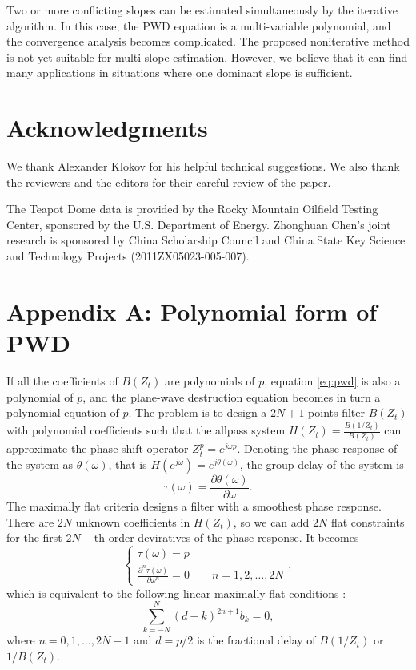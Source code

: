 Two or more conflicting slopes can be estimated simultaneously by the iterative algorithm.
In this case, the PWD equation is a multi-variable polynomial,
and the convergence analysis becomes complicated.
The proposed noniterative method is not yet suitable for multi-slope estimation.
However, we believe that it can find many applications in situations 
where one dominant slope is sufficient.


\section{Acknowledgments}

We thank Alexander Klokov for his helpful technical suggestions.
We also thank the reviewers and the editors for 
their careful review of the paper.

The Teapot Dome data is provided by the Rocky Mountain Oilfield Testing Center,
sponsored by the U.S. Department of Energy.
Zhonghuan Chen's joint research is sponsored by China Scholarship Council
and China State Key Science and Technology Projects (2011ZX05023-005-007).

\appendix
\section{Appendix A: Polynomial form of PWD}

If all the coefficients of $B(Z_t)$ are polynomials of $p$,
equation \ref{eq:pwd} is also a polynomial of $p$,
and the plane-wave destruction equation becomes 
in turn a polynomial equation of $p$.
The problem is to design a $2N+1$ points filter $B(Z_t)$ 
with polynomial coefficients
such that the allpass system $H(Z_t)=\frac{B(1/Z_t)}{B(Z_t)}$ can approximate 
the phase-shift operator $Z_t^p=e^{j\omega p}$.
Denoting the phase response of the system as $\theta(\omega)$,
that is $H(e^{j\omega})=e^{j\theta(\omega)}$,
the group delay of the system is
\begin{equation}
\tau(\omega)=\frac{\partial \theta(\omega)}{\partial \omega}.
\end{equation}
The maximally flat criteria designs a filter 
with a smoothest phase response. 
There are $2N$ unknown coefficients in $H(Z_t)$,
so we can add $2N$ flat constraints for the first $2N-$th order deviratives
of the phase response. 
It becomes
\cite[~equation 7]{zhang2009maxflat}
\begin{equation}
\left\{\begin{array}{l}
\tau(\omega)=p \\
\displaystyle{\frac{\partial^n\tau(\omega)}{\partial \omega^n}}=0
\qquad n=1,2,\dots,2N
\end{array}\right.,
\end{equation}
which is equivalent to the following linear maximally flat conditions
\cite[]{thiran1971recursive}:
\begin{equation}\label{eq:mf:cond}
\sum_{k=-N}^N (d-k)^{2n+1}b_k =0,
\end{equation}
where $n=0,1,\dots,2N-1$ and 
$d=p/2$ is the fractional delay of $B(1/Z_t)$ or $1/B(Z_t)$.

